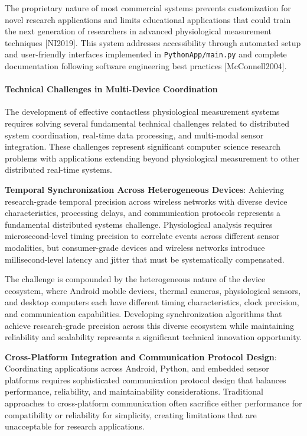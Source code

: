 \documentclass[11pt,a4paper]{article}
\begin{document}
The proprietary nature of most commercial systems prevents customization for
novel research applications and limits
educational applications that could train the next generation of researchers in
advanced physiological measurement
techniques [NI2019]. This system addresses accessibility through automated setup
and user-friendly interfaces
implemented in \texttt{PythonApp/main.py} and complete documentation following
software engineering best
practices [McConnell2004].

\paragraph{Technical Challenges in Multi-Device Coordination}

The development of effective contactless physiological measurement systems
requires solving several fundamental
technical challenges related to distributed system coordination, real-time data
processing, and multi-modal sensor
integration. These challenges represent significant computer science research
problems with applications extending
beyond physiological measurement to other distributed real-time systems.

\textbf{Temporal Synchronization Across Heterogeneous Devices}: Achieving research-grade temporal precision across wireless
networks with diverse device characteristics, processing delays, and
communication protocols represents a fundamental
distributed systems challenge. Physiological analysis requires microsecond-level
timing precision to correlate events
across different sensor modalities, but consumer-grade devices and wireless
networks introduce millisecond-level latency
and jitter that must be systematically compensated.

The challenge is compounded by the heterogeneous nature of the device ecosystem,
where Android mobile devices, thermal
cameras, physiological sensors, and desktop computers each have different timing
characteristics, clock precision, and
communication capabilities. Developing synchronization algorithms that achieve
research-grade precision across this
diverse ecosystem while maintaining reliability and scalability represents a
significant technical innovation
opportunity.

\textbf{Cross-Platform Integration and Communication Protocol Design}: Coordinating applications across Android, Python, and
embedded sensor platforms requires sophisticated communication protocol design
that balances performance, reliability,
and maintainability considerations. Traditional approaches to cross-platform
communication often sacrifice either
performance for compatibility or reliability for simplicity, creating
limitations that are unacceptable for research
applications.
\end{document}
